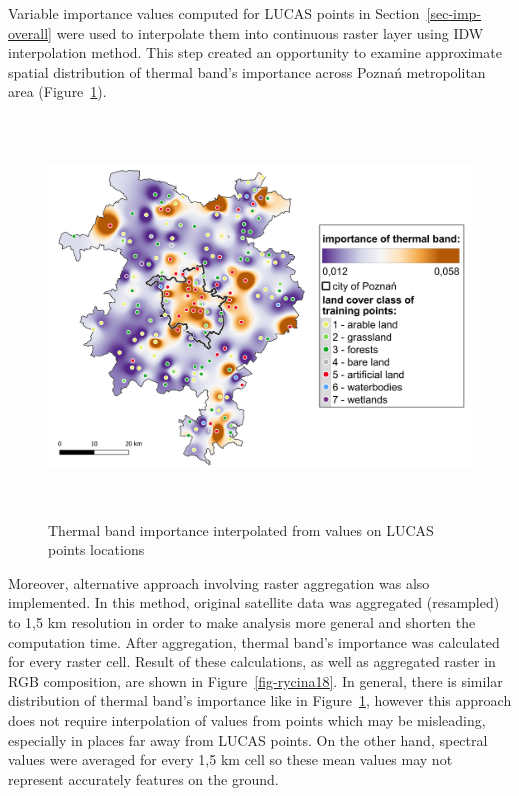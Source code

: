 \documentclass{amuthesis}
\begin{document}
Variable importance values computed for LUCAS points in
Section~\ref{sec-imp-overall} were used to interpolate them into
continuous raster layer using IDW interpolation method. This step
created an opportunity to examine approximate spatial distribution of
thermal band's importance across Poznań metropolitan area
(Figure~\ref{fig-rycina17}).

\begin{figure}[H]

{\centering \includegraphics[width=5.875in,height=4.16667in]{./figures/B10_importance-spatial-ENG.png}

}

\caption{\label{fig-rycina17}Thermal band importance interpolated from
values on LUCAS points locations}

\end{figure}

Moreover, alternative approach involving raster aggregation was also
implemented. In this method, original satellite data was aggregated
(resampled) to 1,5 km resolution in order to make analysis more general
and shorten the computation time. After aggregation, thermal band's
importance was calculated for every raster cell. Result of these
calculations, as well as aggregated raster in RGB composition, are shown
in Figure~\ref{fig-rycina18}. In general, there is similar distribution
of thermal band's importance like in Figure~\ref{fig-rycina17}, however
this approach does not require interpolation of values from points which
may be misleading, especially in places far away from LUCAS points. On
the other hand, spectral values were averaged for every 1,5 km cell so
these mean values may not represent accurately features on the ground.
\end{document}
